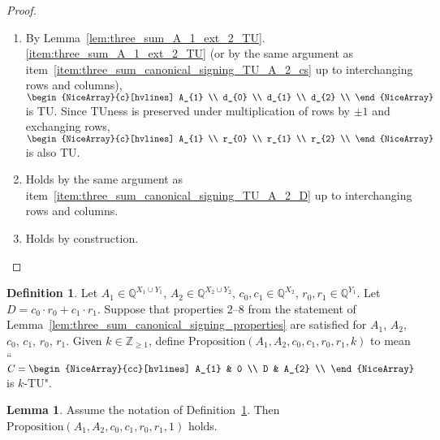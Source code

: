 \documentclass{article}
\theoremstyle{definition}
\newtheorem{lemma}[theorem]{Lemma}
\newtheorem{definition}[theorem]{Definition}
\begin{document}
\begin{proof}
\begin{enumerate}
        \item By Lemma~\ref{lem:three_sum_A_1_ext_2_TU}.\ref{item:three_sum_A_1_ext_2_TU} (or by the same argument as item~\ref{item:three_sum_canonical_signing_TU_A_2_cs} up to interchanging rows and columns),\\ $\begin{NiceArray}{c}[hvlines] A_{1} \\ d_{0} \\ d_{1} \\ d_{2} \\ \end{NiceArray}$ is TU. Since TUness is preserved under multiplication of rows by $\pm 1$ and exchanging rows, $\begin{NiceArray}{c}[hvlines] A_{1} \\ r_{0} \\ r_{1} \\ r_{2} \\ \end{NiceArray}$ is also TU.
        \item Holds by the same argument as item~\ref{item:three_sum_canonical_signing_TU_A_2_D} up to interchanging rows and columns.
        \item Holds by construction.
    \end{enumerate}
\end{proof}

\begin{definition}\label{def:three_sum_alt_form}
    Let $A_{1} \in \mathbb{Q}^{X_{1} \cup Y_{1}}$, $A_{2} \in \mathbb{Q}^{X_{2} \cup Y_{2}}$, $c_{0}, c_{1} \in \mathbb{Q}^{X_{2}}$, $r_{0}, r_{1} \in \mathbb{Q}^{Y_{1}}$. Let $D = c_{0} \cdot r_{0} + c_{1} \cdot r_{1}$. Suppose that properties 2--8 from the statement of Lemma~\ref{lem:three_sum_canonical_signing_properties} are satisfied for $A_{1}$, $A_{2}$, $c_{0}$, $c_{1}$, $r_{0}$, $r_{1}$. Given $k \in \mathbb{Z}_{\geq 1}$, define $\mathrm{Proposition}(A_{1}, A_{2}, c_{0}, c_{1}, r_{0}, r_{1}, k)$ to mean ``$C = \begin{NiceArray}{cc}[hvlines] A_{1} & 0 \\ D & A_{2} \\ \end{NiceArray}$ is $k$-TU".
\end{definition}

\begin{lemma}\label{lem:three_sum_alt_form_1_TU}
    Assume the notation of Definition~\ref{def:three_sum_alt_form}. Then $\mathrm{Proposition}(A_{1}, A_{2}, c_{0}, c_{1}, r_{0}, r_{1}, 1)$ holds.
\end{lemma}
\end{document}
